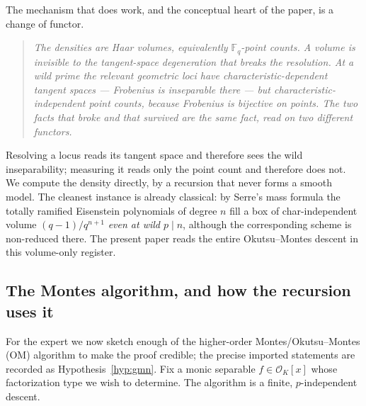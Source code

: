 \documentclass[pdflatex,sn-mathphys-num]{sn-jnl}%
\newcommand{\OK}{\mathcal{O}_K}
\newcommand{\bbF}{\mathbb{F}}
\theoremstyle{plain}
\theoremstyle{definition}
\theoremstyle{remark}
\numberwithin{equation}{section}
\begin{document}
The mechanism that does work, and the conceptual heart of the paper, is a change
of functor.

\begin{quote}
\emph{The densities are Haar volumes, equivalently $\bbF_{q}$-point counts. A
volume is invisible to the tangent-space degeneration that breaks the resolution.
At a wild prime the relevant geometric loci have characteristic-dependent tangent
spaces --- Frobenius is inseparable there --- but characteristic-independent point
counts, because Frobenius is bijective on points. The two facts that broke and
that survived are the same fact, read on two different functors.}
\end{quote}

Resolving a locus reads its tangent space and therefore sees the wild
inseparability; measuring it reads only the point count and therefore does not. We
compute the density directly, by a recursion that never forms a smooth model. The
cleanest instance is already classical: by Serre's mass formula
\cite{serre1978formule} the totally ramified Eisenstein polynomials of degree $n$
fill a box of char-independent volume $(q-1)/q^{n+1}$ \emph{even at wild $p\mid n$},
although the corresponding scheme is non-reduced there. The present paper reads the
entire Okutsu--Montes descent in this volume-only register.

\subsection{The Montes algorithm, and how the recursion uses it}\label{sec:montes-sketch}

For the expert we now sketch enough of the higher-order Montes/Okutsu--Montes (OM)
algorithm to make the proof credible; the precise imported statements are recorded
as Hypothesis~\ref{hyp:gmn}. Fix a monic separable $f\in\OK[x]$ whose factorization
type we wish to determine. The algorithm is a finite, $p$-independent descent.
\end{document}
